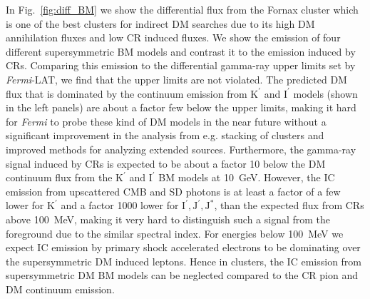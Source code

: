 \documentclass[10pt,aps,pra,reprint,amsmath,amsfonts,amssymb,showpacs,nofootinbib,floatfix]{revtex4-1}
\newcommand{\Fermi}{{\em Fermi}\xspace}
\newcommand{\rmn}{\mathrm}
\newcommand{\Kp}{\rmn{K}^\prime}
\newcommand{\Ip}{\rmn{I}^\prime}
\newcommand{\Js}{\rmn{J}^*}
\newcommand{\Jp}{\rmn{J}^\prime}
\begin{document}
In Fig.~\ref{fig:diff_BM} we show the differential flux from the
Fornax cluster which is one of the best clusters for indirect DM
searches due to its high DM annihilation fluxes and low CR induced
fluxes. We show the emission of four different supersymmetric BM
models and contrast it to the emission induced by CRs. Comparing this
emission to the differential gamma-ray upper limits set by \Fermi-LAT,
we find that the upper limits are not violated. The predicted DM flux
that is dominated by the continuum emission from $\Kp$ and $\Ip$
models (shown in the left panels) are about a factor few below the
upper limits, making it hard for \Fermi to probe these kind of DM
models in the near future without a significant improvement in the
analysis from e.g. stacking of clusters and improved methods for
analyzing extended sources. Furthermore, the gamma-ray signal induced
by CRs is expected to be about a factor 10 below the DM continuum flux
from the $\Kp$ and $\Ip$ BM models at 10~GeV. However, the IC emission
from upscattered CMB and SD photons is at least a factor of a few
lower for $\Kp$ and a factor 1000 lower for $\Ip,\Jp,\Js$, than the
expected flux from CRs above 100~MeV, making it very hard to
distinguish such a signal from the foreground due to the similar
spectral index. For energies below 100~MeV we expect IC emission by
primary shock accelerated electrons to be dominating
\cite{2010MNRAS.409..449P} over the supersymmetric DM induced
leptons. Hence in clusters, the IC emission from supersymmetric DM BM
models can be neglected compared to the CR pion and DM continuum
emission.
\end{document}
